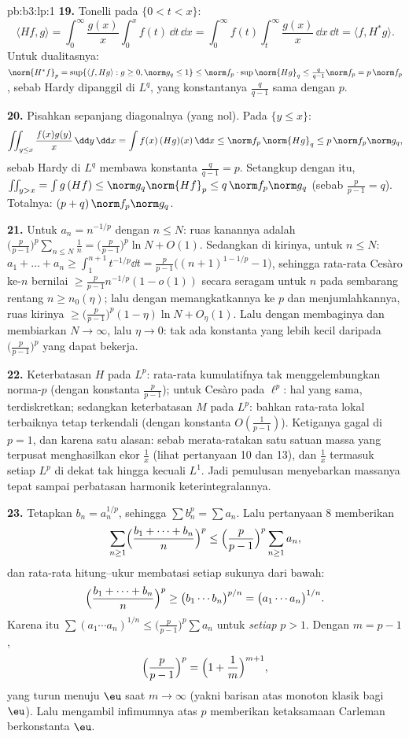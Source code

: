 \begin{solution}{pb:b3:lp:1}
\textbf{19.} Tonelli pada $\{0 < t < x\}$:
\[
\langle Hf, g\rangle =
\int_0^\infty\frac{g(x)}x\int_0^xf(t)\,\dd t\,\dd x
= \int_0^\infty f(t)\int_t^\infty\frac{g(x)}x\,\dd x\,\dd t
= \langle f, H^*g\rangle .
\]
Untuk dualitasnya: $\norm{H^*f}_p = \sup\{\langle f, Hg\rangle : g
\geq 0, \norm g_q \leq 1\} \leq \norm f_p\cdot
\sup\norm{Hg}_q \leq \frac q{q-1}\norm f_p = p\,\norm f_p$,
sebab Hardy dipanggil di $L^q$, yang konstantanya $\frac q{q-1}$
sama dengan $p$.

\textbf{20.} Pisahkan sepanjang diagonalnya (yang nol). Pada $\{y \leq
x\}$:
\[
\iint_{y\leq x}\frac{f(x)g(y)}{x}\,\dd y\,\dd x
= \int f(x)\,(Hg)(x)\,\dd x \leq \norm f_p\,\norm{Hg}_q
\leq p\,\norm f_p\norm g_q,
\]
sebab Hardy di $L^q$ membawa konstanta $\frac q{q-1} =
p$. Setangkup dengan itu, $\iint_{y>x} = \int g\,(Hf) \leq
\norm g_q\norm{Hf}_p \leq q\,\norm f_p\norm g_q$ (sebab $\frac
p{p-1} = q$). Totalnya: $(p + q)\,\norm f_p\norm g_q$.

\textbf{21.} Untuk $a_n = n^{-1/p}$ dengan $n \leq N$: ruas
kanannya adalah $\bigl(\frac p{p-1}\bigr)^p\sum_{n\leq N}\frac1n =
\bigl(\frac p{p-1}\bigr)^p\ln N + O(1)$. Sedangkan di kirinya, untuk $n
\leq N$: $a_1 + \dots + a_n \geq \int_1^{n+1}t^{-1/p}\dd t =
\frac{p}{p-1}\bigl((n+1)^{1-1/p} - 1\bigr)$, sehingga rata-rata
Cesàro ke-$n$ bernilai $\geq \frac p{p-1}n^{-1/p}(1 -
o(1))$ secara seragam untuk $n$ pada sembarang rentang $n \geq n_0(\eta)$;
lalu dengan memangkatkannya ke $p$ dan menjumlahkannya, ruas kirinya $\geq
\bigl(\frac p{p-1}\bigr)^p(1 - \eta)\ln N + O_\eta(1)$.
Lalu dengan membaginya dan membiarkan $N \to \infty$, lalu $\eta \to 0$: tak ada
konstanta yang lebih kecil daripada $\bigl(\frac p{p-1}\bigr)^p$ yang dapat bekerja.

\textbf{22.} Keterbatasan $H$ pada $L^p$: rata-rata kumulatifnya tak
menggelembungkan norma-$p$ (dengan konstanta $\frac p{p-1}$); untuk Cesàro pada
$\ell^p$: hal yang sama, terdiskretkan; sedangkan keterbatasan $M$ pada $L^p$: bahkan
rata-rata lokal terbaiknya tetap terkendali (dengan konstanta
$O(\frac1{p-1})$). Ketiganya gagal di $p = 1$, dan karena satu
alasan: sebab merata-ratakan satu satuan massa yang terpusat menghasilkan
ekor $\frac1x$ (lihat pertanyaan 10 dan 13), dan $\frac1x$ termasuk
setiap $L^p$ di dekat tak hingga kecuali $L^1$. Jadi pemulusan menyebarkan
massanya tepat sampai perbatasan harmonik keterintegralannya.

\textbf{23.} Tetapkan $b_n = a_n^{1/p}$, sehingga $\sum b_n^p = \sum
a_n$. Lalu pertanyaan 8 memberikan
\[
\sum_{n\geq1}\Bigl(\frac{b_1 + \dots + b_n}n\Bigr)^{p}
\leq \Bigl(\frac p{p-1}\Bigr)^{p}\sum_{n\geq1}a_n,
\]
dan rata-rata hitung--ukur membatasi setiap sukunya dari bawah:
\[
\Bigl(\frac{b_1 + \dots + b_n}n\Bigr)^{p}
\geq \bigl(b_1\cdots b_n\bigr)^{p/n}
= \bigl(a_1\cdots a_n\bigr)^{1/n}.
\]
Karena itu $\sum(a_1\cdots a_n)^{1/n} \leq \bigl(\frac
p{p-1}\bigr)^p\sum a_n$ untuk \emph{setiap} $p > 1$. Dengan $m =
p - 1$,
\[
\Bigl(\frac p{p-1}\Bigr)^{p} =
\Bigl(1 + \frac1m\Bigr)^{m+1},
\]
yang turun menuju $\eu$ saat $m \to \infty$ (yakni barisan atas
monoton klasik bagi $\eu$). Lalu mengambil infimumnya atas
$p$ memberikan ketaksamaan Carleman berkonstanta $\eu$.


\end{solution}
